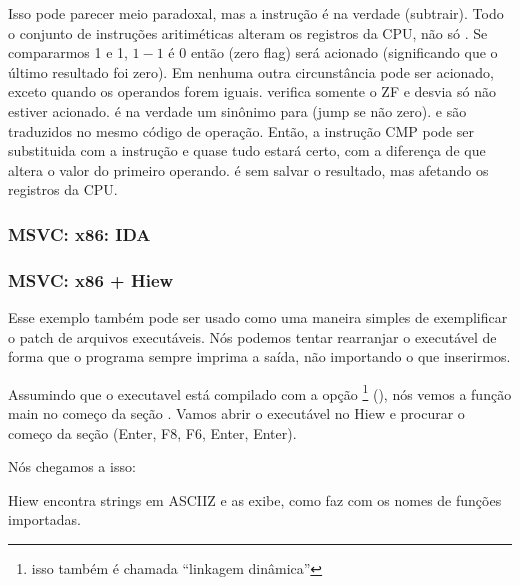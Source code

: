 \label{CMPandSUB}
Isso pode parecer meio paradoxal, mas a instrução \CMP é na verdade \SUB (subtrair).
Todo o conjunto de instruções aritiméticas alteram os registros da \ac{CPU}, não só \CMP.
Se compararmos 1 e 1, $1-1$ é 0 então \ZF (zero flag) será acionado (significando que o último resultado foi zero).
Em nenhuma outra circunstância \ZF pode ser acionado, exceto quando os operandos forem iguais.
\JNE verifica somente o ZF e desvia só não estiver acionado.
\JNE é na verdade um sinônimo para \JNZ (jump se não zero).
\JNE e \JNZ são traduzidos no mesmo código de operação.
Então, a instrução CMP pode ser substituida com a instrução \SUB e quase tudo estará certo, com a diferença de que \SUB altera o valor do primeiro operando.
\CMP é \SUB sem salvar o resultado, mas afetando os registros da \ac{CPU}.

\subsubsection{MSVC: x86: IDA}

\PTBRph{}


\clearpage
\subsubsection{MSVC: x86 + Hiew}

Esse exemplo também pode ser usado como uma maneira simples de exemplificar o patch de arquivos executáveis.
Nós podemos tentar rearranjar o executável de forma que o programa sempre imprima a saída, não importando o que inserirmos.

Assumindo que o executavel está compilado com a opção \footnote{isso também é chamada ``linkagem dinâmica''}
(), nós vemos a função main no começo da seção .
Vamos abrir o executável no Hiew e procurar o começo da seção  (Enter, F8, F6, Enter, Enter).

Nós chegamos a isso:

\begin{figure}[H]
\centering
{}
\caption{\PTBRph{}}
\label{fig:scanf_ex3_hiew_1}
\end{figure}

Hiew encontra strings em \ac{ASCIIZ} e as exibe, como faz com os nomes de funções importadas.

